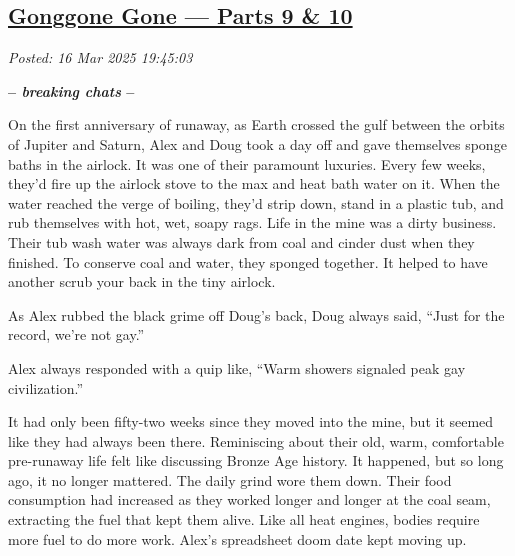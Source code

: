 %

\subsection*{\href{http://analyzethedatanotthedrivel.org/2025/03/16/gonggone-gone-parts-9-10/}{Gonggone Gone --- Parts 9 \& 10}}


\noindent\emph{Posted: 16 Mar 2025 19:45:03}
\vspace{6pt}

\begin{center}\large\textbf{-- \emph{breaking chats} --}\normalsize\end{center}

On the first anniversary of runaway, as Earth crossed the gulf between
the orbits of Jupiter and Saturn, Alex and Doug took a day off and gave
themselves sponge baths in the airlock. It was one of their paramount
luxuries. Every few weeks, they'd fire up the airlock stove to the max
and heat bath water on it. When the water reached the verge of boiling,
they'd strip down, stand in a plastic tub, and rub themselves with hot,
wet, soapy rags. Life in the mine was a dirty business. Their tub wash
water was always dark from coal and cinder dust when they finished. To
conserve coal and water, they sponged together. It helped to have
another scrub your back in the tiny airlock.

As Alex rubbed the black grime off Doug's back, Doug always said, ``Just
for the record, we're not gay.''

Alex always responded with a quip like, ``Warm showers signaled peak gay
civilization.''

It had only been fifty-two weeks since they moved into the mine, but it
seemed like they had always been there. Reminiscing about their old,
warm, comfortable pre-runaway life felt like discussing Bronze Age
history. It happened, but so long ago, it no longer mattered. The daily
grind wore them down. Their food consumption had increased as they
worked longer and longer at the coal seam, extracting the fuel that kept
them alive. Like all heat engines, bodies require more fuel to do more
work. Alex's spreadsheet doom date kept moving up.


